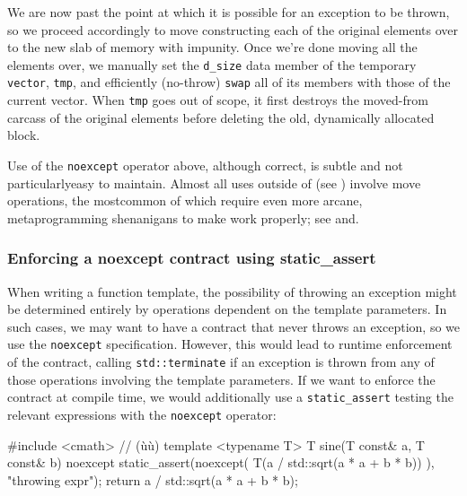 We are now past the point at which it is possible for an exception to be
thrown, so we proceed accordingly to move constructing each of the
original elements over to the new slab of memory with impunity. Once
we're done moving all the elements over, we manually set the
\lstinline!d_size! data member of the temporary \lstinline!vector!,
\lstinline!tmp!, and efficiently (no-throw) \lstinline!swap! all of its
members with those of the current vector. When \lstinline!tmp! goes out of
scope, it first destroys the moved-from carcass of the original elements
before deleting the old, dynamically allocated block.

Use of the \lstinline!noexcept! operator above, although correct, is subtle
and not particularly\linebreak[4] easy to maintain. Almost all uses outside of
\linebreak[4] (see
) involve move operations, the
most\linebreak[4] common of which require even more arcane, metaprogramming
shenanigans to make work properly; see  and\linebreak[4] .

\subsubsection[Enforcing a \lstinline!noexcept! contract using \lstinline!static_assert!]{Enforcing a {\SubsubsecCode noexcept} contract using {\SubsubsecCode static\_assert}}\label{enforcing-a-noexcept-contract-using-static_assert}

When writing a function template, the possibility of throwing an
exception might be determined entirely by operations dependent on the
template parameters. In such cases, we may want to have a contract that
never throws an exception, so we use the \lstinline!noexcept!
specification. However, this would lead to runtime enforcement of the
contract, calling \lstinline!std::terminate! if an exception is thrown from
any of those operations involving the template parameters. If we want to
enforce the contract at compile time, we would additionally use a
\lstinline!static_assert! testing the relevant expressions with the
\lstinline!noexcept! operator:

\begin{emcppslisting}
#include <cmath>  // (ù{}ù)
template <typename T>
T sine(T const& a, T const& b) noexcept
{
   static_assert(noexcept( T(a / std::sqrt(a * a + b * b)) ), "throwing expr");
   return a / std::sqrt(a * a + b * b);
}
\end{emcppslisting}
    

